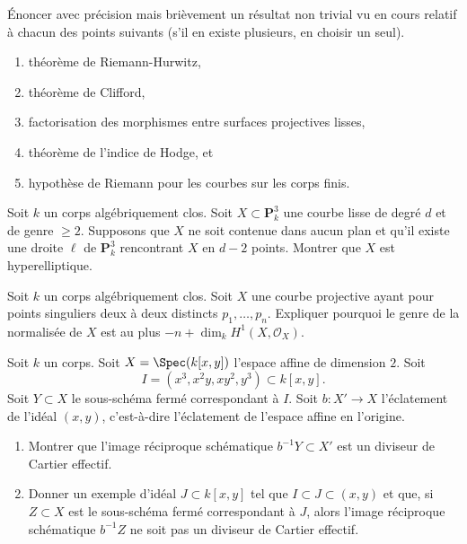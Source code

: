 \begin{exercise}[Théorèmes]
\label{exercise-results-spring-2018}
Énoncer avec précision mais brièvement un résultat non trivial vu en cours
relatif à chacun des points suivants (s'il en existe plusieurs, en choisir
un seul).
\begin{enumerate}
\item théorème de Riemann-Hurwitz,
\item théorème de Clifford,
\item factorisation des morphismes entre surfaces projectives lisses,
\item théorème de l'indice de Hodge, et
\item hypothèse de Riemann pour les courbes sur les corps finis.
\end{enumerate}
\end{exercise}

\begin{exercise}
\label{exercise-hyperelliptic}
Soit $k$ un corps algébriquement clos. Soit $X \subset \mathbf{P}^3_k$
une courbe lisse de degré $d$ et de genre $\geq 2$. Supposons que $X$
ne soit contenue dans aucun plan et qu'il existe
une droite $\ell$ de $\mathbf{P}^3_k$ rencontrant $X$ en $d - 2$ points.
Montrer que $X$ est hyperelliptique.
\end{exercise}

\begin{exercise}
\label{exercise-singular}
Soit $k$ un corps algébriquement clos. Soit $X$ une courbe projective
ayant pour points singuliers deux à deux distincts $p_1, \ldots, p_n$.
Expliquer pourquoi le genre de la normalisée de $X$ est au plus
$-n + \dim_k H^1(X, \mathcal{O}_X)$.
\end{exercise}

\begin{exercise}
\label{exercise-how-many-blowups}
Soit $k$ un corps. Soit $X = \Spec(k[x, y])$ l'espace affine de dimension $2$.
Soit
$$
I = (x^3, x^2y, xy^2, y^3) \subset k[x, y].
$$
Soit $Y \subset X$ le sous-schéma fermé correspondant à $I$.
Soit $b : X' \to X$ l'éclatement de l'idéal $(x, y)$, c'est-à-dire
l'éclatement de l'espace affine en l'origine.
\begin{enumerate}
\item Montrer que l'image réciproque schématique $b^{-1}Y \subset X'$
est un diviseur de Cartier effectif.
\item Donner un exemple d'idéal $J \subset k[x, y]$
tel que $I \subset J \subset (x, y)$ et que, si $Z \subset X$
est le sous-schéma fermé correspondant à $J$, alors l'image réciproque
schématique $b^{-1}Z$ ne soit pas un diviseur de Cartier effectif.
\end{enumerate}
\end{exercise}

